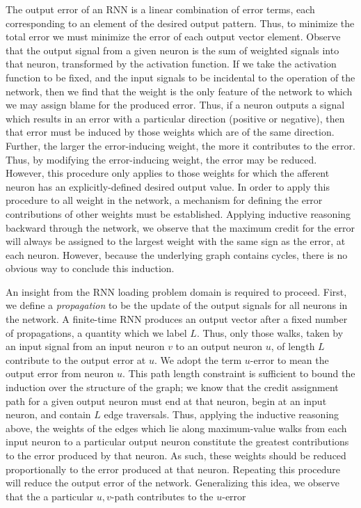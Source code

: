 \documentclass[12pt]{article}
\begin{document}
	The output error of an RNN is a linear combination of error terms, each corresponding to an element of the desired output pattern. Thus, to minimize the total error we must minimize the error of each output vector element. Observe that the output signal from a given neuron is the sum of weighted signals into that neuron, transformed by the activation function. If we take the activation function to be fixed, and the input signals to be incidental to the operation of the network, then we find that the weight is the only feature of the network to which we may assign blame for the produced error. Thus, if a neuron outputs a signal which results in an error with a particular direction (positive or negative), then that error must be induced by those weights which are of the same direction. Further, the larger the error-inducing weight, the more it contributes to the error. Thus, by modifying the error-inducing weight, the error may be reduced. However, this procedure only applies to those weights for which the afferent neuron has an explicitly-defined desired output value. In order to apply this procedure to all weight in the network, a mechanism for defining the error contributions of other weights must be established. Applying inductive reasoning backward through the network, we observe that the maximum credit for the error will always be assigned to the largest weight with the same sign as the error, at each neuron. However, because the underlying graph contains cycles, there is no obvious way to conclude this induction. 
	
	An insight from the RNN loading problem domain is required to proceed. First, we define a \emph{propagation} to be the update of the output signals for all neurons in the network. A finite-time RNN produces an output vector after a fixed number of propagations, a quantity which we label $L$. Thus, only those walks, taken by an input signal from an input neuron $v$ to an output neuron $u$, of length $L$ contribute to the output error at $u$. We adopt the term $u$-error to mean the output error from neuron $u$. This path length constraint is sufficient to bound the induction over the structure of the graph; we know that the credit assignment path for a given output neuron must end at that neuron, begin at an input neuron, and contain $L$ edge traversals. Thus, applying the inductive reasoning above, the weights of the edges which lie along maximum-value walks from each input neuron to a particular output neuron constitute the greatest contributions to the error produced by that neuron. As such, these weights should be reduced proportionally to the error produced at that neuron. Repeating this procedure will reduce the output error of the network. Generalizing this idea, we observe that the a particular $u,v$-path contributes to the $u$-error 
	
\end{document}
